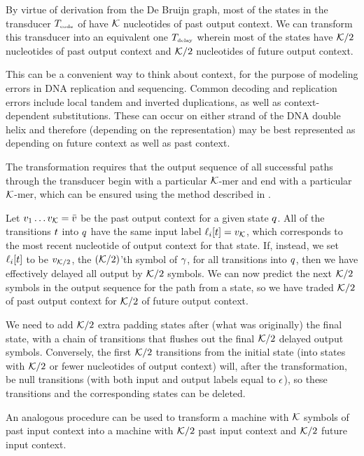 \documentclass[english]{article}
\begin{document}
By virtue of derivation from the De Bruijn graph,
most of the states in the transducer $T_{\mbox{\tiny code}}$ of 
have ${\cal K}$ nucleotides of past output context.
We can transform this transducer into an equivalent one $T_{\mbox{\tiny delay}}$ wherein most of the states have
${\cal K}/2$ nucleotides of past output context
and ${\cal K}/2$ nucleotides of future output context.

This can be a convenient way to think about context, for the purpose of modeling errors in DNA replication and sequencing.
Common decoding and replication errors include local tandem and inverted duplications, as well as context-dependent substitutions.
These can occur on either strand of the DNA double helix and therefore (depending on the representation) may be best represented as depending
on future context as well as past context.

The transformation requires that the output sequence of all successful paths through the transducer
begin with a particular ${\cal K}$-mer and end with a particular ${\cal K}$-mer,
which can be ensured using the method described in .

Let $v_{1} \ldots v_{{\cal K}} = \bar{v}$ be the past output context for a given state $q$.
All of the transitions $t$ into $q$ have the same input label $\ell_i[t] = v_{{\cal K}}$,
which corresponds to the most recent nucleotide of output context for that state.
If, instead, we set $\ell_i[t]$ to be $v_{{\cal K}/2}$, the $({\cal K}/2)$'th symbol of $\gamma$,
for all transitions into $q$, then we have effectively delayed all output by ${\cal K}/2$ symbols.
We can now predict the next ${\cal K}/2$ symbols in the output sequence for the path from a state,
so we have traded ${\cal K}/2$ of past output context for ${\cal K}/2$ of future output context.

We need to add ${\cal K}/2$ extra padding states after (what was originally) the final state,
with a chain of transitions that flushes out the final ${\cal K}/2$ delayed output symbols.
Conversely, the first ${\cal K}/2$ transitions from the initial state
(into states with ${\cal K}/2$ or fewer nucleotides of output context)
will, after the transformation,
be null transitions (with both input and output labels equal to $\epsilon$),
so these transitions and the corresponding states can be deleted.

An analogous procedure can be used to transform a machine with ${\cal K}$ symbols of past input context
into a machine with ${\cal K}/2$ past input context and ${\cal K}/2$ future input context.
\end{document}
